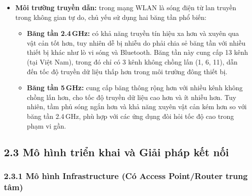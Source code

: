 \begin{itemize}
    Wireless Router hoặc DHCP Server cấp phát, cho phép định tuyến gói tin chính xác trong hệ thống mạng.
    \item \textbf{Môi trường truyền dẫn:} trong mạng WLAN là sóng điện từ lan truyền trong không 
    gian tự do, chủ yếu sử dụng hai băng tần phổ biến:
        \begin{itemize}
            \item \textbf{Băng tần 2.4\,GHz:} có khả năng truyền tín hiệu xa hơn và xuyên qua vật 
            cản tốt hơn, tuy nhiên dễ bị nhiễu do phải chia sẻ băng tần với nhiều thiết bị khác như 
            lò vi sóng và Bluetooth. Băng tần này cung cấp 13 kênh (tại Việt Nam), trong đó chỉ có 
            3 kênh không chồng lấn (1, 6, 11), dẫn đến tốc độ truyền dữ liệu thấp hơn trong môi 
            trường đông thiết bị.
            \item \textbf{Băng tần 5\,GHz:} cung cấp băng thông rộng hơn với nhiều kênh không chồng 
            lấn hơn, cho tốc độ truyền dữ liệu cao hơn và ít nhiễu hơn. Tuy nhiên, tầm phủ sóng 
            ngắn hơn và khả năng xuyên vật cản kém hơn so với băng tần 2.4\,GHz, phù hợp với các 
            ứng dụng đòi hỏi tốc độ cao trong phạm vi gần.
        \end{itemize}
\end{itemize}
\subsection{2.3 Mô hình triển khai và Giải pháp kết nối}

\subsubsection{2.3.1 Mô hình Infrastructure (Có Access Point/Router trung tâm)\cite{kurose2017}}

